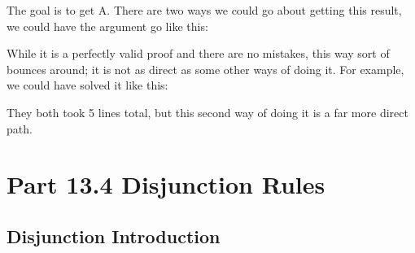 The goal is to get \enot A. There are two ways we could go about getting this result, we could have the argument go like this:

\begin{fitchproof}
            
            
\end{fitchproof}

While it is a perfectly valid proof and there are no mistakes, this way sort of bounces around; it is not as direct as some other ways of doing it. For example, we could have solved it like this:

\begin{fitchproof}
            
            
\end{fitchproof}

They both took 5 lines total, but this second way of doing it is a far more direct path.
\section{Part 13.4 Disjunction Rules}
\subsection{Disjunction Introduction}

